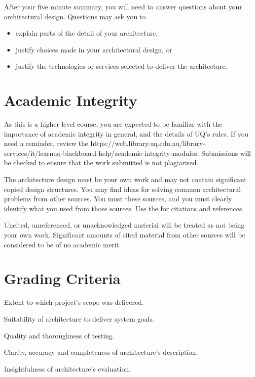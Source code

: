 \documentclass{csse4400}
\begin{document}
After your five minute summary, you will need to answer questions about your architectural design.
Questions may ask you to
\begin{itemize}[itemsep=3pt]
	\item explain parts of the detail of your architecture,
	\item justify choices made in your architectural design, or
	\item justify the technologies or services selected to deliver the architecture.
\end{itemize}


\section{Academic Integrity}
As this is a higher-level course, you are expected to be familiar with the importance of academic integrity in general, and the details of UQ's rules.
If you need a reminder, review the 
{https://web.library.uq.edu.au/library-services/it/learnuq-blackboard-help/academic-integrity-modules}.
Submissions will be checked to ensure that the work submitted is not plagiarised.

The architecture design must be your own work and may not contain significant copied design structures.
You may find ideas for solving common architectural problems from other sources.
You must  these sources, and you must clearly identify what you used from those sources.
Use the  for citations and references.

Uncited, unreferenced, or unacknowledged material will be treated as not being your own work.
Significant amounts of cited material from other sources will be considered to be of no academic merit.


\section{Grading Criteria}

\begin{description}[itemsep=3pt]
    \item[20\%] Extent to which project's scope was delivered.
    \item[20\%] Suitability of architecture to deliver system goals.
    \item[20\%] Quality and thoroughness of testing.
    \item[20\%] Clarity, accuracy and completeness of architecture's description.
    \item[20\%] Insightfulness of architecture's evaluation.
\end{description}



\end{document}
